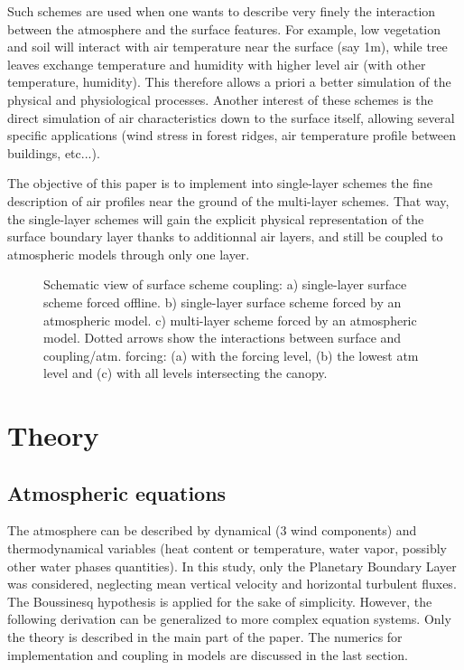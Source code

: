 \begin{itemize}
Such schemes are used when one wants to describe very finely the interaction between the atmosphere and the surface features. For example, low vegetation and soil will interact with air temperature near the surface (say 1m), while tree leaves exchange temperature and humidity with higher level air (with other temperature, humidity). This therefore allows a priori  a better simulation of the physical and physiological processes. Another interest of these schemes is the direct simulation of air characteristics down to the surface itself, allowing several specific applications (wind stress in forest ridges, air temperature profile between buildings, etc...).
\end{itemize}

The objective of this paper is to implement into single-layer schemes the fine description of air profiles near the ground of the multi-layer schemes. That way, the single-layer schemes will gain the explicit physical representation of the surface boundary layer thanks to additionnal air layers, and still be coupled to atmospheric models through only one layer. 

\begin{figure}[h]
\hspace*{2.cm}
\caption{Schematic view of surface scheme coupling: a) single-layer surface scheme forced offline. b) single-layer surface scheme forced by an atmospheric model. c) multi-layer scheme forced by an atmospheric model. Dotted arrows show the interactions between surface and coupling/atm. forcing: (a) with the forcing level, (b) the lowest atm level and (c) with all levels intersecting the canopy.\label{fig1}}
\end{figure}


\section{Theory}


\subsection{Atmospheric equations}

The atmosphere can be described by dynamical (3 wind components) and thermodynamical variables (heat content or temperature, water vapor, possibly other water phases quantities). In this study, only the Planetary Boundary Layer was considered, neglecting mean vertical velocity and horizontal turbulent fluxes. The Boussinesq hypothesis is applied for the sake of simplicity. However, the following derivation can be generalized to more complex equation systems. Only the theory is described in the main part of the paper. The numerics for implementation and coupling in models are discussed in the last section.\\

